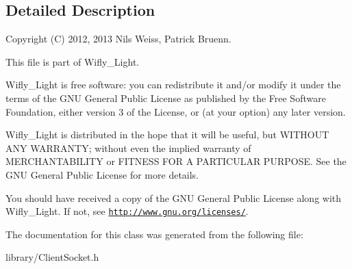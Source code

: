 \subsection{Detailed Description}
\begin{DoxyVerb}Copyright (C) 2012, 2013 Nils Weiss, Patrick Bruenn.
\end{DoxyVerb}


This file is part of Wifly\-\_\-\-Light.

Wifly\-\_\-\-Light is free software\-: you can redistribute it and/or modify it under the terms of the G\-N\-U General Public License as published by the Free Software Foundation, either version 3 of the License, or (at your option) any later version.

Wifly\-\_\-\-Light is distributed in the hope that it will be useful, but W\-I\-T\-H\-O\-U\-T A\-N\-Y W\-A\-R\-R\-A\-N\-T\-Y; without even the implied warranty of M\-E\-R\-C\-H\-A\-N\-T\-A\-B\-I\-L\-I\-T\-Y or F\-I\-T\-N\-E\-S\-S F\-O\-R A P\-A\-R\-T\-I\-C\-U\-L\-A\-R P\-U\-R\-P\-O\-S\-E. See the G\-N\-U General Public License for more details.

You should have received a copy of the G\-N\-U General Public License along with Wifly\-\_\-\-Light. If not, see \href{http://www.gnu.org/licenses/}{\tt http\-://www.\-gnu.\-org/licenses/}. 

The documentation for this class was generated from the following file\-:\begin{DoxyCompactItemize}
\item 
library/Client\-Socket.\-h\end{DoxyCompactItemize}
